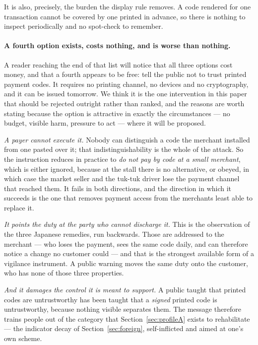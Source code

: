 \documentclass[10pt,a4paper,twocolumn]{article}
\begin{document}
It is also, precisely, the burden the display rule removes. A code rendered for
one transaction cannot be covered by one printed in advance, so there is nothing
to inspect periodically and no spot-check to remember.

\paragraph{A fourth option exists, costs nothing, and is worse than nothing.}
A reader reaching the end of that list will notice that all three options cost
money, and that a fourth appears to be free: tell the public not to trust
printed payment codes. It requires no printing channel, no devices and no
cryptography, and it can be issued tomorrow. We think it is the one intervention
in this paper that should be rejected outright rather than ranked, and the
reasons are worth stating because the option is attractive in exactly the
circumstances --- no budget, visible harm, pressure to act --- where it will be
proposed.

\emph{A payer cannot execute it.} Nobody can distinguish a code the merchant
installed from one pasted over it; that indistinguishability is the whole of
the attack. So the instruction reduces in practice to \emph{do not pay by code
at a small merchant}, which is either ignored, because at the stall there is no
alternative, or obeyed, in which case the market seller and the tuk-tuk driver
lose the payment channel that reached them. It fails in both directions, and
the direction in which it succeeds is the one that removes payment access from
the merchants least able to replace it.

\emph{It points the duty at the party who cannot discharge it.} This is the
observation of the three Japanese remedies, run backwards. Those are addressed
to the merchant --- who loses the payment, sees the same code daily, and can
therefore notice a change no customer could --- and that is the strongest
available form of a vigilance instrument. A public warning moves the same duty
onto the customer, who has none of those three properties.

\emph{And it damages the control it is meant to support.} A public taught that
printed codes are untrustworthy has been taught that a \emph{signed} printed
code is untrustworthy, because nothing visible separates them. The message
therefore trains people out of the category that Section~\ref{sec:profileA}
exists to rehabilitate --- the indicator decay of Section~\ref{sec:foreign},
self-inflicted and aimed at one's own scheme.
\end{document}
